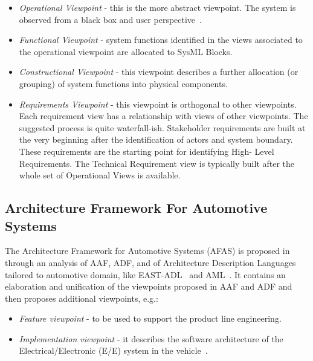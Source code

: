 \begin{itemize}
\item {\em Operational Viewpoint} - this is the more abstract viewpoint. %
The system is observed from a black box and user perspective~\cite{AFRenault}.
\item {\em Functional  Viewpoint} - system functions %
identified in the views associated to the operational viewpoint %
are allocated to SysML Blocks. 
\item {\em Constructional Viewpoint} - this viewpoint %
describes a further allocation (or grouping) of system functions into physical components.
\item {\em Requirements Viewpoint} - this viewpoint is orthogonal to other viewpoints. Each requirement view has a relationship with views of
other viewpoints. The suggested process is quite waterfall-ish. Stakeholder requirements are built
at the very beginning after the identification of actors and system boundary. These requirements are the starting point for identifying High-
Level Requirements. The Technical Requirement view is typically built 
after the whole set of Operational Views is available.
\end{itemize}

\subsection{Architecture Framework For Automotive Systems}
The Architecture Framework for Automotive Systems (AFAS) is proposed in~\cite{Yania} through an analysis of AAF, ADF, and of Architecture Description Languages~\cite{ADL_Neno00,whatindustrywants} tailored to automotive domain, like EAST-ADL~\cite{EAST-ADL} %
and AML~\cite{AML}. 
It contains an elaboration and unification of the viewpoints proposed in AAF and ADF and then proposes additional viewpoints, e.g.:

\begin{itemize}
\item {\em Feature viewpoint} - to be used to support the product line engineering. %
\item {\em Implementation viewpoint} - 
it describes the software architecture of the Electrical/Electronic (E/E) system in the vehicle~\cite{EAST-ADL}. %
\end{itemize}


